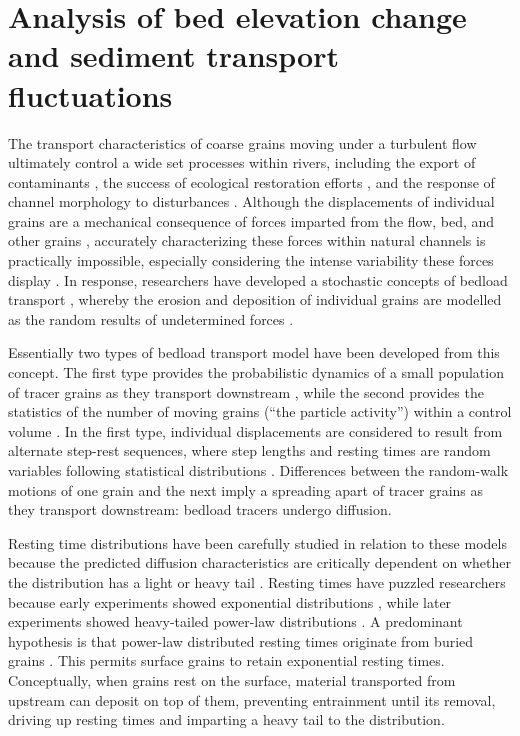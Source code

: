 
\chapter{Analysis of bed elevation change and sediment transport fluctuations}
\label{ch:ch3}

The transport characteristics of coarse grains moving under a turbulent flow ultimately control a wide set processes within rivers, including the export of contaminants \citep{Malmon2005,Macklin2006}, the success of ecological restoration efforts \citep{Gaeuman2017}, and the response of channel morphology to disturbances \citep{Hassan2017}.
Although the displacements of individual grains are a mechanical consequence of forces imparted from the flow, bed, and other grains \citep{Wiberg1985, Vowinckel2014,Gonzalez2017}, accurately characterizing these forces within natural channels is practically impossible, especially considering the intense variability these forces display \citep{Schmeeckle2007,Celik2010, Dwivedi2011}.
In response, researchers have developed a stochastic concepts of bedload transport \citep{Einstein1937}, whereby the erosion and deposition of individual grains are modelled as the random results of undetermined forces \citep{Einstein1950,Paintal1971,Ancey2006}.

Essentially two types of bedload transport model have been developed from this concept.
The first type provides the probabilistic dynamics of a small population of tracer grains as they transport downstream \citep{Einstein1937,Hubbell1964, Nakagawa1976,Martin2012,Lajeunesse2017,Wu2019}, while the second provides the statistics of the number of moving grains (``the particle activity'') within a control volume \citep{Einstein1950,Ancey2006,Furbish2012a}.
In the first type, individual displacements are considered to result from alternate step-rest sequences, where step lengths and resting times are random variables following statistical distributions \citep{Einstein1937}. 
Differences between the random-walk motions of one grain and the next imply a spreading apart of tracer grains as they transport downstream: bedload tracers undergo diffusion.

Resting time distributions have been carefully studied in relation to these models because the predicted diffusion characteristics are critically dependent on whether the distribution has a light or heavy tail \citep{Bradley2017,Martin2012,Weeks1998}.
Resting times have puzzled researchers because early experiments showed exponential distributions \citep{Einstein1937,Hubbell1964, Yano1969,Nakagawa1976}, while later experiments showed heavy-tailed power-law distributions \citep{Martin2012,Voepel2013, Olinde2015, Pretzlav2016a, Bradley2017, Liu2019}.
A predominant hypothesis is that power-law distributed resting times originate from buried grains \citep{Martin2014,Voepel2013}. This permits surface grains to retain exponential resting times. 
Conceptually, when grains rest on the surface, material transported from upstream can deposit on top of them, preventing entrainment until its removal, driving up resting times and imparting a heavy tail to the distribution.

